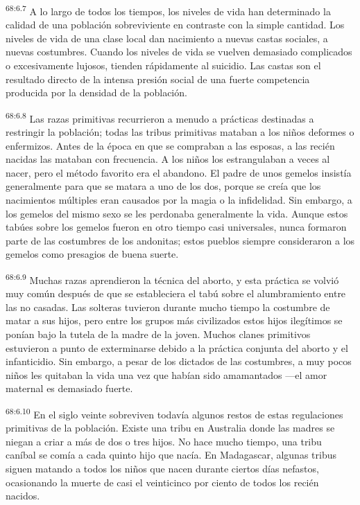 \par
\textsuperscript{68:6.7} A lo largo de todos los tiempos, los niveles de vida han determinado la calidad de una población sobreviviente en contraste con la simple cantidad. Los niveles de vida de una clase local dan nacimiento a nuevas castas sociales, a nuevas costumbres. Cuando los niveles de vida se vuelven demasiado complicados o excesivamente lujosos, tienden rápidamente al suicidio. Las castas son el resultado directo de la intensa presión social de una fuerte competencia producida por la densidad de la población.

\par
\textsuperscript{68:6.8} Las razas primitivas recurrieron a menudo a prácticas destinadas a restringir la población; todas las tribus primitivas mataban a los niños deformes o enfermizos. Antes de la época en que se compraban a las esposas, a las recién nacidas las mataban con frecuencia. A los niños los estrangulaban a veces al nacer, pero el método favorito era el abandono. El padre de unos gemelos insistía generalmente para que se matara a uno de los dos, porque se creía que los nacimientos múltiples eran causados por la magia o la infidelidad. Sin embargo, a los gemelos del mismo sexo se les perdonaba generalmente la vida. Aunque estos tabúes sobre los gemelos fueron en otro tiempo casi universales, nunca formaron parte de las costumbres de los andonitas; estos pueblos siempre consideraron a los gemelos como presagios de buena suerte.

\par
\textsuperscript{68:6.9} Muchas razas aprendieron la técnica del aborto, y esta práctica se volvió muy común después de que se estableciera el tabú sobre el alumbramiento entre las no casadas. Las solteras tuvieron durante mucho tiempo la costumbre de matar a sus hijos, pero entre los grupos más civilizados estos hijos ilegítimos se ponían bajo la tutela de la madre de la joven. Muchos clanes primitivos estuvieron a punto de exterminarse debido a la práctica conjunta del aborto y el infanticidio. Sin embargo, a pesar de los dictados de las costumbres, a muy pocos niños les quitaban la vida una vez que habían sido amamantados ---el amor maternal es demasiado fuerte.

\par
\textsuperscript{68:6.10} En el siglo veinte sobreviven todavía algunos restos de estas regulaciones primitivas de la población. Existe una tribu en Australia donde las madres se niegan a criar a más de dos o tres hijos. No hace mucho tiempo, una tribu caníbal se comía a cada quinto hijo que nacía. En Madagascar, algunas tribus siguen matando a todos los niños que nacen durante ciertos días nefastos, ocasionando la muerte de casi el veinticinco por ciento de todos los recién nacidos.

